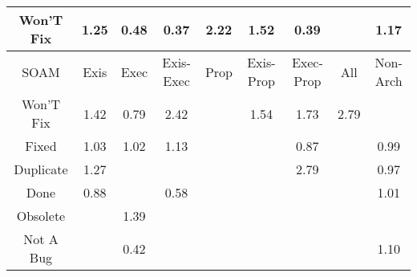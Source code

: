 \begin{tabular}{|c||c|c|c|c|c|c|c|c|}
\hline
Won'T Fix & \cellcolor[rgb]{0.901550868205164,0.8359977796761303,0.42} 1.25 & \cellcolor[rgb]{0.8243776736202773,0.43472098846931173,0.3400858287122587} 0.48 & \cellcolor[rgb]{0.8065768475539905,0.3504637450888885,0.3234717243837245} 0.37 & \cellcolor[rgb]{0.8689659218461012,0.8205628050849952,0.42} 2.22 & \cellcolor[rgb]{0.8926144718137611,0.8317647498065184,0.42} 1.52 & \cellcolor[rgb]{0.8100570916062062,0.36693690026937614,0.3267199521657925} 0.39 &  & \cellcolor[rgb]{0.9042598988155736,0.8372810047021138,0.42} 1.17 \\ 
\hline
\hline
SOAM & Exis & Exec & Exis-Exec & Prop & Exis-Prop & Exec-Prop & All & Non-Arch \\ 
\hline
Won'T Fix & \cellcolor[rgb]{0.895739719097631,0.8332451300988777,0.41999999999999993} 1.42 & \cellcolor[rgb]{0.8757332092450659,0.6778038570933123,0.38801766196206156} 0.79 & \cellcolor[rgb]{0.8621293744858458,0.817324440545927,0.42} 2.42 &  & \cellcolor[rgb]{0.891838708361767,0.8313972829082055,0.42} 1.54 & \cellcolor[rgb]{0.8854423378381109,0.8283674231864736,0.42} 1.73 & \cellcolor[rgb]{0.8499394754186825,0.8115502778299022,0.42} 2.79 &  \\ 
\hline
Fixed & \cellcolor[rgb]{0.909097065672026,0.8395722942656965,0.42} 1.03 & \cellcolor[rgb]{0.9091726568579777,0.8396081006169368,0.42} 1.02 & \cellcolor[rgb]{0.9056272211959446,0.8379286837243948,0.42} 1.13 &  &  & \cellcolor[rgb]{0.8889923174245891,0.7405636358097214,0.4003928295962831} 0.87 &  & \cellcolor[rgb]{0.9090668483041544,0.8355830819729971,0.4191290584172107} 0.99 \\ 
\hline
Duplicate & \cellcolor[rgb]{0.9010247203430788,0.8357485517414582,0.42} 1.27 &  &  &  &  & \cellcolor[rgb]{0.849684383290255,0.8114294447164365,0.42} 2.79 &  & \cellcolor[rgb]{0.9052653089018053,0.8175891288018788,0.41558095497501835} 0.97 \\ 
\hline
Done & \cellcolor[rgb]{0.8899112805150896,0.7449133944380906,0.40125052848075027} 0.88 &  & \cellcolor[rgb]{0.8406820938130792,0.5118952440485751,0.35530328755887397} 0.58 &  &  &  &  & \cellcolor[rgb]{0.9095691318004683,0.8397959045370639,0.42} 1.01 \\ 
\hline
Obsolete &  & \cellcolor[rgb]{0.896775309799227,0.8337356730627917,0.42} 1.39 &  &  &  &  &  &  \\ 
\hline
Not A Bug &  & \cellcolor[rgb]{0.8137896470400139,0.38460432932273236,0.3302036705706796} 0.42 &  &  &  &  &  & \cellcolor[rgb]{0.9066243252612379,0.8384009961763758,0.42} 1.10 \\ 

\end{tabular}
